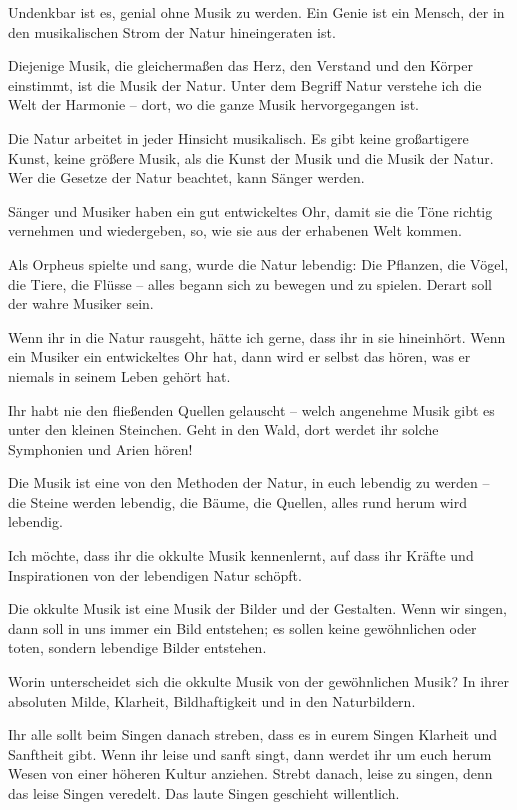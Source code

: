 \documentclass[11pt,a5paper,twoside]{article}
\begin{document}
Undenkbar ist es, genial ohne Musik zu werden. Ein Genie ist ein Mensch, der in den musikalischen Strom der Natur hineingeraten ist.

Diejenige Musik, die gleichermaßen das Herz, den Verstand und den Körper einstimmt, ist die Musik der Natur. Unter dem Begriff Natur verstehe ich die Welt der Harmonie – dort, wo die ganze Musik hervorgegangen ist.

Die Natur arbeitet in jeder Hinsicht musikalisch. Es gibt keine großartigere Kunst, keine größere Musik, als die Kunst der Musik und die Musik der Natur. Wer die Gesetze der Natur beachtet, kann Sänger werden. 

Sänger und Musiker haben ein gut entwickeltes Ohr, damit sie die Töne richtig vernehmen und wiedergeben, so, wie sie aus der erhabenen Welt kommen. 

Als Orpheus spielte und sang, wurde die Natur lebendig: Die Pflanzen, die Vögel, die Tiere, die Flüsse – alles begann sich zu bewegen und zu spielen. Derart soll der wahre Musiker sein.

Wenn ihr in die Natur rausgeht, hätte ich gerne, dass ihr in sie hineinhört. Wenn ein Musiker ein entwickeltes Ohr hat, dann wird er selbst das hören, was er niemals in seinem Leben gehört hat. 

Ihr habt nie den fließenden Quellen gelauscht -- welch angenehme Musik gibt es unter den kleinen Steinchen. Geht in den Wald, dort werdet ihr solche Symphonien und Arien hören!

Die Musik ist eine von den Methoden der Natur, in euch lebendig zu werden – die Steine werden lebendig, die Bäume, die Quellen, alles rund herum wird lebendig.

Ich möchte, dass ihr die okkulte Musik kennenlernt, auf dass ihr Kräfte und Inspirationen von der lebendigen Natur schöpft.

Die okkulte Musik ist eine Musik der Bilder und der Gestalten. Wenn wir singen, dann soll in uns immer ein Bild entstehen; es sollen keine gewöhnlichen oder toten, sondern lebendige Bilder entstehen.

Worin unterscheidet sich die okkulte Musik von der gewöhnlichen Musik? In ihrer absoluten Milde, Klarheit, Bildhaftigkeit und in den Naturbildern.

Ihr alle sollt beim Singen danach streben, dass es in eurem Singen Klarheit und Sanftheit gibt. Wenn ihr leise und sanft singt, dann werdet ihr um euch herum Wesen von einer höheren Kultur anziehen. Strebt danach, leise zu singen, denn das leise Singen veredelt. Das laute Singen geschieht willentlich.
\end{document}
